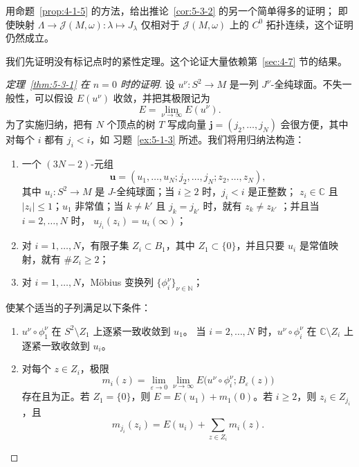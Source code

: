 \begin{exercise}\label{ex:5-3-3}
用命题~\ref{prop:4-1-5} 的方法，给出推论~\ref{cor:5-3-2} 的另一个简单得多的证明；
即使映射
$\Lambda\to\mathcal J(M,\omega):\lambda\mapsto J_\lambda$
仅相对于 $\mathcal J(M,\omega)$ 上的 $C^0$ 拓扑连续，这个证明仍然成立。
\end{exercise}

我们先证明没有标记点时的紧性定理。这个论证大量依赖第~\ref{sec:4-7} 节的结果。

\begin{proof}[定理~\ref{thm:5-3-1} 在 $n=0$ 时的证明]
设 $u^\nu:S^2\to M$ 是一列 $J^\nu$-全纯球面。不失一般性，可以假设
$E(u^\nu)$ 收敛，并把其极限记为
\[
  E=\lim_{\nu\to\infty}E(u^\nu).
\]
为了实施归纳，把有 $N$ 个顶点的树 $T$ 写成向量
$\mathbf j=(j_2,\ldots,j_N)$ 会很方便，其中对每个 $i$ 都有 $j_i<i$，如
习题~\ref{ex:5-1-3} 所述。我们将用归纳法构造：
\begin{enumerate}[label=(\alph*),leftmargin=3em]
\item 一个 $(3N-2)$-元组
\[
  \mathbf u=(u_1,\ldots,u_N;j_2,\ldots,j_N;z_2,\ldots,z_N),
\]
其中 $u_i:S^2\to M$ 是 $J$-全纯球面；当 $i\ge2$ 时，$j_i<i$ 是正整数；
$z_i\in\mathbb C$ 且 $|z_i|\le1$；$u_1$ 非常值；当 $k\ne k'$ 且
$j_k=j_{k'}$ 时，就有 $z_k\ne z_{k'}$
；并且当
$i=2,\ldots,N$ 时，
$u_{j_i}(z_i)=u_i(\infty)$；
\item 对 $i=1,\ldots,N$，有限子集 $Z_i\subset B_1$，其中
$Z_1\subset\{0\}$，并且只要 $u_i$ 是常值映射，就有 $\#Z_i\ge2$；
\item 对 $i=1,\ldots,N$，Möbius 变换列
$\{\phi_i^\nu\}_{\nu\in\mathbb N}$；
\end{enumerate}
使某个适当的子列满足以下条件：
\begin{enumerate}[label=(\roman*),leftmargin=3em]
\item $u^\nu\circ\phi_1^\nu$ 在 $S^2\setminus Z_1$ 上逐紧一致收敛到 $u_1$。
当 $i=2,\ldots,N$ 时，$u^\nu\circ\phi_i^\nu$ 在 $\mathbb C\setminus Z_i$ 上
逐紧一致收敛到 $u_i$。

\item 对每个 $z\in Z_i$，极限
\[
  m_i(z)=\lim_{\varepsilon\to0}\lim_{\nu\to\infty}
  E\bigl(u^\nu\circ\phi_i^\nu;B_\varepsilon(z)\bigr)
\]
存在且为正。若 $Z_1=\{0\}$，则 $E=E(u_1)+m_1(0)$。若 $i\ge2$，则
$z_i\in Z_{j_i}$，且
\[
  m_{j_i}(z_i)=E(u_i)+\sum_{z\in Z_i}m_i(z).
\]


\end{enumerate}
\end{proof}

